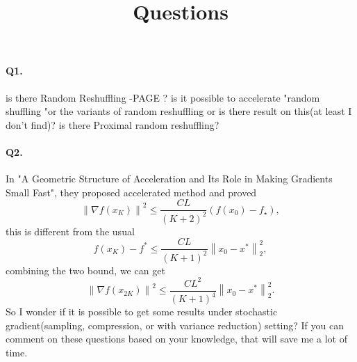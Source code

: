 \documentclass[12pt,a4paper]{article}
\title{Questions}
\begin{document}
\maketitle
\paragraph{Q1.} is there Random Reshuffling -PAGE ? is it possible to accelerate "random shuffling "or the variants of random reshuffling or is there result on this(at least I don't find)? is there Proximal random reshuffling?
\paragraph{Q2.}In "A Geometric Structure of Acceleration and Its Role in Making Gradients Small Fast", they proposed accelerated method and proved
\begin{equation}
	\left\|\nabla f\left(x_{K}\right)\right\|^{2} \leq \frac{C L}{(K+2)^{2}}\left(f\left(x_{0}\right)-f_{\star}\right),	
\end{equation}
this is different from the usual
\begin{equation*}
	f\left(x_{K}\right)-f^{*} \leq \frac{C L}{(K+1)^{2} }\left\|x_{0}-x^{*}\right\|_{2}^{2},
\end{equation*}
combining the two bound, we can get
\begin{equation*}
	\left\|\nabla f\left(x_{2K}\right)\right\|^{2} \leq  \frac{C L^2}{(K+1)^{4} }\left\|x_{0}-x^{*}\right\|_{2}^{2}.
\end{equation*}
So I wonder if it is possible to get some results under stochastic gradient(sampling, compression, or with variance reduction) setting?
\newline
If you can comment on these questions based on your knowledge, that will save me a lot of time.
\end{document}
